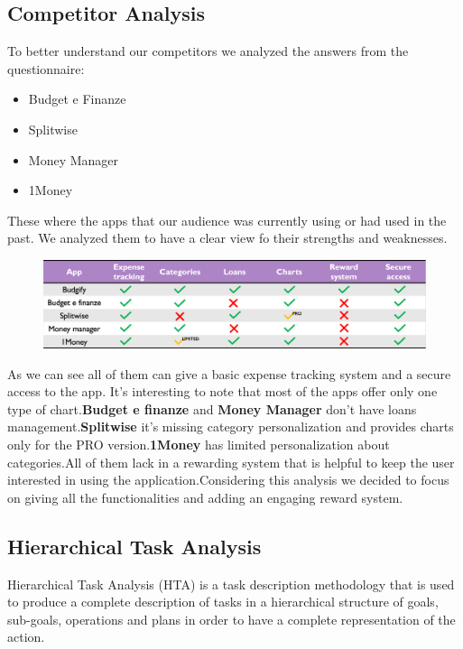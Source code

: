 \documentclass[a4paper,12pt]{article}
\begin{document}
\subsection{Competitor Analysis}
To better understand our competitors we analyzed the answers from the questionnaire:
\begin{itemize}
    \item Budget e Finanze
    \item Splitwise
    \item Money Manager
    \item 1Money
\end{itemize}
These where the apps that our audience was currently using or had used in the past. We analyzed them to have a clear view fo their strengths and weaknesses.
\begin{figure}[H]
    \centering
    \includegraphics[width=\linewidth]{Competitors_table.png}
\end{figure}
\noindent As we can see all of them can give a basic expense tracking system and a secure access to the app. It's interesting to note that most of the apps offer only one type of chart.\newline \textbf{Budget e finanze} and \textbf{Money Manager} don't have loans management.\newline \textbf{Splitwise} it's missing category personalization and provides charts only for the PRO version.\newline \textbf{1Money} has limited personalization about categories.\newline All of them lack in a rewarding system that is helpful to keep the user interested in using the application.\newline Considering this analysis we decided to focus on giving all the functionalities and adding an engaging reward system.
\subsection{Hierarchical Task Analysis}

Hierarchical Task Analysis (HTA) is a task description methodology that is used to produce a complete description of tasks in a hierarchical structure of goals, sub-goals, operations and plans in order
to have a complete representation of the action.
\end{document}

